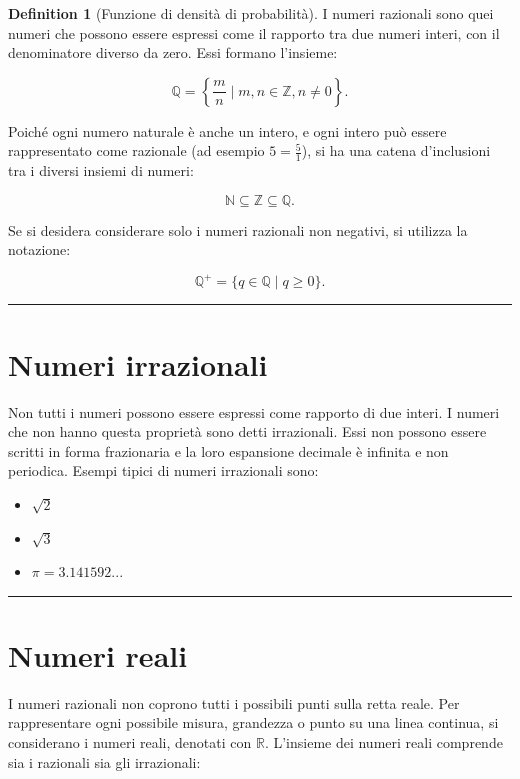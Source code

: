 \documentclass[
  letterpaper,
  DIV=11,
  numbers=noendperiod,
  oneside]{scrreprt}
\providecommand{\tightlist}{%
  \setlength{\itemsep}{0pt}\setlength{\parskip}{0pt}}
\theoremstyle{definition}
\theoremstyle{plain}
\theoremstyle{definition}
\newtheorem{definition}{Definition}[chapter]
\theoremstyle{remark}
\begin{document}
\begin{definition}[Funzione di densità di
probabilità]
I numeri razionali sono quei numeri che possono essere espressi come il
rapporto tra due numeri interi, con il denominatore diverso da zero.
Essi formano l'insieme:

\[
\mathbb{Q} = \left\{\frac{m}{n} \mid m,n \in \mathbb{Z}, n \neq 0\right\}.
\]

Poiché ogni numero naturale è anche un intero, e ogni intero può essere
rappresentato come razionale (ad esempio \(5 = \frac{5}{1}\)), si ha una
catena d'inclusioni tra i diversi insiemi di numeri:

\[
\mathbb{N} \subseteq \mathbb{Z} \subseteq \mathbb{Q}.
\]

Se si desidera considerare solo i numeri razionali non negativi, si
utilizza la notazione:

\[
\mathbb{Q}^+ = \{q \in \mathbb{Q} \mid q \geq 0\}.
\]

\begin{center}\rule{0.5\linewidth}{0.5pt}\end{center}

\section{Numeri irrazionali}\label{numeri-irrazionali}

Non tutti i numeri possono essere espressi come rapporto di due interi.
I numeri che non hanno questa proprietà sono detti irrazionali. Essi non
possono essere scritti in forma frazionaria e la loro espansione
decimale è infinita e non periodica. Esempi tipici di numeri irrazionali
sono:

\begin{itemize}
\tightlist
\item
  \(\sqrt{2}\)
\item
  \(\sqrt{3}\)
\item
  \(\pi = 3.141592...\)
\end{itemize}

\begin{center}\rule{0.5\linewidth}{0.5pt}\end{center}

\section{Numeri reali}\label{numeri-reali}

I numeri razionali non coprono tutti i possibili punti sulla retta
reale. Per rappresentare ogni possibile misura, grandezza o punto su una
linea continua, si considerano i numeri reali, denotati con
\(\mathbb{R}\). L'insieme dei numeri reali comprende sia i razionali sia
gli irrazionali:


\end{definition}
\end{document}
